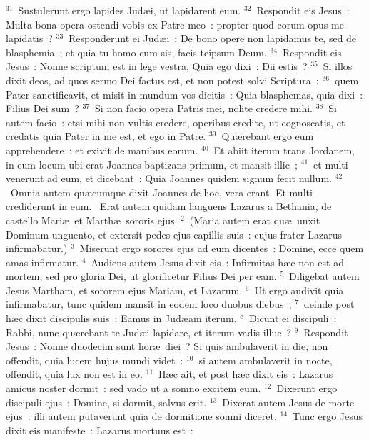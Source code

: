 ${}^{31}$~Sustulerunt ergo lapides Jud\ae i, ut lapidarent eum.
${}^{32}$~Respondit eis Jesus~: Multa bona opera ostendi vobis ex Patre meo~: propter quod eorum opus me lapidatis~?
${}^{33}$~Responderunt ei Jud\ae i~: De bono opere non lapidamus te, sed de blasphemia~; et quia tu homo cum sis, facis teipsum Deum.
${}^{34}$~Respondit eis Jesus~: Nonne scriptum est in lege vestra, Quia ego dixi~: Dii estis~?
${}^{35}$~Si illos dixit deos, ad quos sermo Dei factus est, et non potest solvi Scriptura~:
${}^{36}$~quem Pater sanctificavit, et misit in mundum vos dicitis~: Quia blasphemas, quia dixi~: Filius Dei sum~?
${}^{37}$~Si non facio opera Patris mei, nolite credere mihi.
${}^{38}$~Si autem facio~: etsi mihi non vultis credere, operibus credite, ut cognoscatis, et credatis quia Pater in me est, et ego in Patre.
${}^{39}$~Qu\ae rebant ergo eum apprehendere~: et exivit de manibus eorum.
${}^{40}$~Et abiit iterum trans Jordanem, in eum locum ubi erat Joannes baptizans primum, et mansit illic~;
${}^{41}$~et multi venerunt ad eum, et dicebant~: Quia Joannes quidem signum fecit nullum.
${}^{42}$~Omnia autem qu\ae cumque dixit Joannes de hoc, vera erant. Et multi crediderunt in eum.
~\lettrine[lines=10,image=true,loversize=0.05,lraise=-0.03]{E}{}rat autem quidam languens Lazarus a Bethania, de castello Mari\ae\ et Marth\ae\ sororis ejus.
${}^{2}$~(Maria autem erat qu\ae\ unxit Dominum unguento, et extersit pedes ejus capillis suis~: cujus frater Lazarus infirmabatur.)
${}^{3}$~Miserunt ergo sorores ejus ad eum dicentes~: Domine, ecce quem amas infirmatur.
${}^{4}$~Audiens autem Jesus dixit eis~: Infirmitas h\ae c non est ad mortem, sed pro gloria Dei, ut glorificetur Filius Dei per eam.
${}^{5}$~Diligebat autem Jesus Martham, et sororem ejus Mariam, et Lazarum.
${}^{6}$~Ut ergo audivit quia infirmabatur, tunc quidem mansit in eodem loco duobus diebus~;
${}^{7}$~deinde post h\ae c dixit discipulis suis~: Eamus in Jud\ae am iterum.
${}^{8}$~Dicunt ei discipuli~: Rabbi, nunc qu\ae rebant te Jud\ae i lapidare, et iterum vadis illuc~?
${}^{9}$~Respondit Jesus~: Nonne duodecim sunt hor\ae\ diei~? Si quis ambulaverit in die, non offendit, quia lucem hujus mundi videt~:
${}^{10}$~si autem ambulaverit in nocte, offendit, quia lux non est in eo.
${}^{11}$~H\ae c ait, et post h\ae c dixit eis~: Lazarus amicus noster dormit~: sed vado ut a somno excitem eum.
${}^{12}$~Dixerunt ergo discipuli ejus~: Domine, si dormit, salvus erit.
${}^{13}$~Dixerat autem Jesus de morte ejus~: illi autem putaverunt quia de dormitione somni diceret.
${}^{14}$~Tunc ergo Jesus dixit eis manifeste~: Lazarus mortuus est~:

